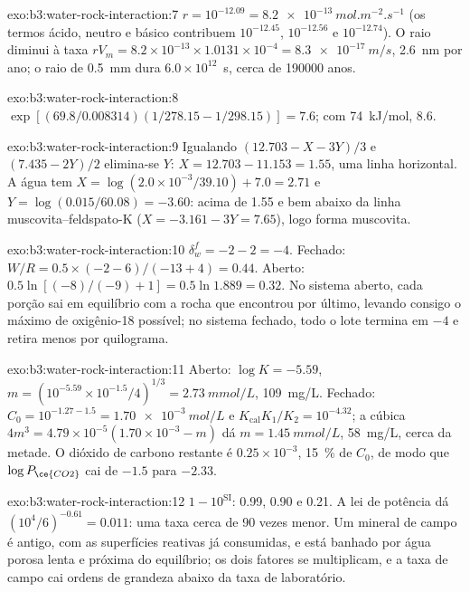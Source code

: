 \begin{solution}{exo:b3:water-rock-interaction:7}
$r = 10^{-12.09} = \qty{8.2e-13}{mol.m^{-2}.s^{-1}}$ (os termos ácido, neutro e
básico contribuem $10^{-12.45}$, $10^{-12.56}$ e $10^{-12.74}$). O raio
diminui à taxa $rV_m = 8.2\times10^{-13}\times1.0131\times10^{-4} =
\qty{8.3e-17}{m/s}$, \qty{2.6}{nm} por ano; o raio de \qty{0.5}{mm} dura
$6.0\times10^{12}$~s, cerca de \num{190000} anos.
\end{solution}

\begin{solution}{exo:b3:water-rock-interaction:8}
$\exp[(69.8/0.008314)(1/278.15 - 1/298.15)] = 7.6$; com
\qty{74}{kJ/mol}, 8.6.
\end{solution}

\begin{solution}{exo:b3:water-rock-interaction:9}
Igualando $(12.703 - X - 3Y)/3$ e $(7.435 - 2Y)/2$ elimina-se $Y$: $X =
12.703 - 11.153 = 1.55$, uma linha horizontal. A água tem $X = \log(2.0\times
10^{-3}/39.10) + 7.0 = 2.71$ e $Y = \log(0.015/60.08) = -3.60$: acima de 1.55
e bem abaixo da linha muscovita--feldspato-K ($X = -3.161 - 3Y = 7.65$), logo
forma muscovita.
\end{solution}

\begin{solution}{exo:b3:water-rock-interaction:10}
$\delta_w^f = -2 - 2 = -4$. Fechado: $W/R = 0.5\times(-2 - 6)/(-13 + 4) =
0.44$. Aberto: $0.5\ln[(-8)/(-9) + 1] = 0.5\ln1.889 = 0.32$. No sistema aberto,
cada porção sai em equilíbrio com a rocha que encontrou por último, levando
consigo o máximo de oxigênio-18 possível; no sistema fechado, todo o lote
termina em $-4$ e retira menos por quilograma.
\end{solution}

\begin{solution}{exo:b3:water-rock-interaction:11}
Aberto: $\log K = -5.59$, $m = (10^{-5.59}\times10^{-1.5}/4)^{1/3} =
\qty{2.73}{mmol/L}$, \qty{109}{mg/L}. Fechado: $C_0 = 10^{-1.27 - 1.5} =
\qty{1.70e-3}{mol/L}$ e $K_{\mathrm{cal}}K_1/K_2 = 10^{-4.32}$; a cúbica
$4m^3 = 4.79\times10^{-5}(1.70\times10^{-3} - m)$ dá $m =
\qty{1.45}{mmol/L}$, \qty{58}{mg/L}, cerca da metade. O dióxido de carbono
restante é $0.25\times10^{-3}$, \qty{15}{\percent} de $C_0$, de modo que
$\log P_{\ce{CO2}}$ cai de $-1.5$ para $-2.33$.
\end{solution}

\begin{solution}{exo:b3:water-rock-interaction:12}
$1 - 10^{\mathrm{SI}}$: 0.99, 0.90 e 0.21. A lei de potência dá
$(10^4/6)^{-0.61} = 0.011$: uma taxa cerca de 90 vezes menor. Um mineral de
campo é antigo, com as superfícies reativas já consumidas, e está banhado por
água porosa lenta e próxima do equilíbrio; os dois fatores se multiplicam, e a
taxa de campo cai ordens de grandeza abaixo da taxa de laboratório.
\end{solution}

